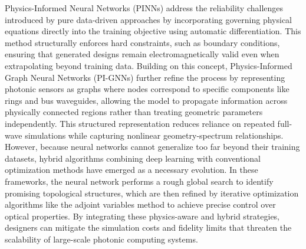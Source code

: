 Physics-Informed Neural Networks (PINNs) address the reliability challenges introduced by pure data-driven approaches by incorporating governing physical equations directly into the training objective using automatic differentiation. \citep{doi_10_1007_s10444_023_10065_9_12bf0652} This method structurally enforces hard constraints, such as boundary conditions, ensuring that generated designs remain electromagnetically valid even when extrapolating beyond training data. Building on this concept, Physics-Informed Graph Neural Networks (PI-GNNs) further refine the process by representing photonic sensors as graphs where nodes correspond to specific components like rings and bus waveguides, allowing the model to propagate information across physically connected regions rather than treating geometric parameters independently. This structured representation reduces reliance on repeated full-wave simulations while capturing nonlinear geometry-spectrum relationships. However, because neural networks cannot generalize too far beyond their training datasets, hybrid algorithms combining deep learning with conventional optimization methods have emerged as a necessary evolution. In these frameworks, the neural network performs a rough global search to identify promising topological structures, which are then refined by iterative optimization algorithms like the adjoint variables method to achieve precise control over optical properties. By integrating these physics-aware and hybrid strategies, designers can mitigate the simulation costs and fidelity limits that threaten the scalability of large-scale photonic computing systems. \citep{s2_cc39d5405a933620426d86298fa8fe4cd51915c5_27626ee3} \citep{doi_10_1109_pn70808_2026_11657775_11c9905d} \citep{doi_10_1021_acsphotonics_2c00968_06a2e96b}


